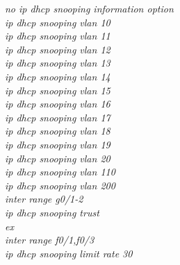 \documentclass[12pt,a4paper]{report}
\begin{document}
\hspace*{2cm}\textit{no ip dhcp snooping information option\\
\hspace*{2cm}ip dhcp snooping vlan 10\\
\hspace*{2cm}ip dhcp snooping vlan 11\\
\hspace*{2cm}ip dhcp snooping vlan 12\\
\hspace*{2cm}ip dhcp snooping vlan 13\\
\hspace*{2cm}ip dhcp snooping vlan 14\\
\hspace*{2cm}ip dhcp snooping vlan 15\\
\hspace*{2cm}ip dhcp snooping vlan 16\\
\hspace*{2cm}ip dhcp snooping vlan 17\\
\hspace*{2cm}ip dhcp snooping vlan 18\\
\hspace*{2cm}ip dhcp snooping vlan 19\\
\hspace*{2cm}ip dhcp snooping vlan 20\\
\hspace*{2cm}ip dhcp snooping vlan 110\\
\hspace*{2cm}ip dhcp snooping vlan 200\\
\hspace*{2cm}inter range g0/1-2\\
\hspace*{2cm}ip dhcp snooping trust\\
\hspace*{2cm}ex\\
\hspace*{2cm}inter range f0/1,f0/3\\
\hspace*{2cm}ip dhcp snooping limit rate 30\\}
\end{document}
